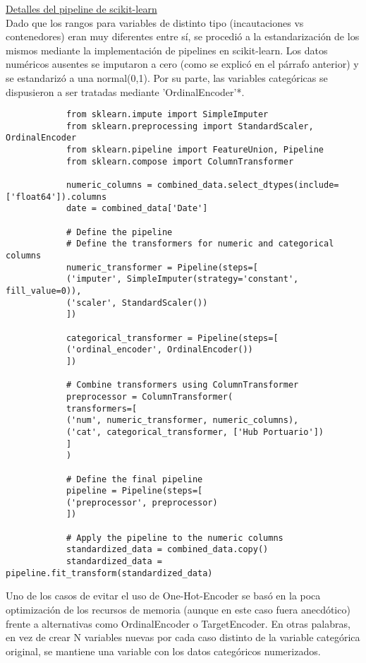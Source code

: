 \documentclass[12pt]{article}
\begin{document}
		\underline{Detalles del pipeline de scikit-learn}\\
		Dado que los rangos para variables de distinto tipo (incautaciones vs contenedores) eran muy diferentes entre sí, se procedió a la estandarización de los mismos mediante la implementación de pipelines en scikit-learn. Los datos numéricos ausentes se imputaron a cero (como se explicó en el párrafo anterior) y se estandarizó a una normal(0,1). Por su parte, las variables categóricas se dispusieron a ser tratadas mediante 'OrdinalEncoder'*.
		
		\begin{verbatim}
			from sklearn.impute import SimpleImputer
			from sklearn.preprocessing import StandardScaler, OrdinalEncoder
			from sklearn.pipeline import FeatureUnion, Pipeline
			from sklearn.compose import ColumnTransformer
			
			numeric_columns = combined_data.select_dtypes(include=['float64']).columns
			date = combined_data['Date']
			
			# Define the pipeline
			# Define the transformers for numeric and categorical columns
			numeric_transformer = Pipeline(steps=[
			('imputer', SimpleImputer(strategy='constant', fill_value=0)),
			('scaler', StandardScaler())
			])
			
			categorical_transformer = Pipeline(steps=[
			('ordinal_encoder', OrdinalEncoder())
			])
			
			# Combine transformers using ColumnTransformer
			preprocessor = ColumnTransformer(
			transformers=[
			('num', numeric_transformer, numeric_columns),
			('cat', categorical_transformer, ['Hub Portuario'])
			]
			)
			
			# Define the final pipeline
			pipeline = Pipeline(steps=[
			('preprocessor', preprocessor)
			])
			
			# Apply the pipeline to the numeric columns
			standardized_data = combined_data.copy()
			standardized_data = pipeline.fit_transform(standardized_data)
		\end{verbatim}
	
		Uno de los casos de evitar el uso de One-Hot-Encoder se basó en la poca optimización de los recursos de memoria (aunque en este caso fuera anecdótico) frente a alternativas como OrdinalEncoder o TargetEncoder. En otras palabras, en vez de crear N variables nuevas por cada caso distinto de la variable categórica original, se mantiene una variable con los datos categóricos numerizados.
		
\end{document}
